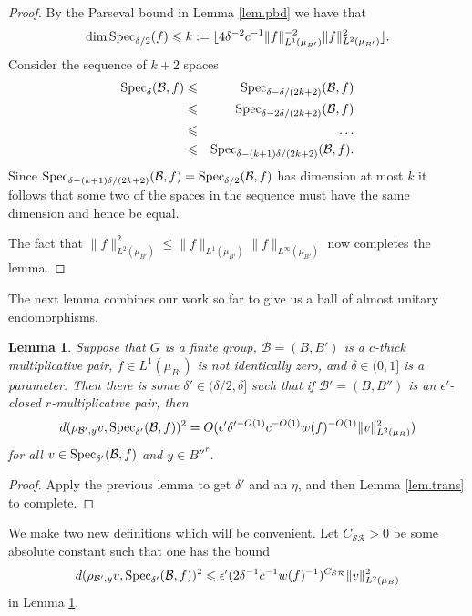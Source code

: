 \documentclass[12pt]{amsart}
\numberwithin{equation}{section}
\theoremstyle{plain}
\newtheorem{lemma}[subsection]{Lemma}
\theoremstyle{definition}
\renewcommand{\leq}{\leqslant}
\providecommand{\Spec}{\mathop{\rm Spec}\nolimits}
\begin{document}
\begin{proof}
By the Parseval bound in Lemma \ref{lem.pbd} we have that
\begin{equation*}
\dim \Spec_{\delta/2}(f) \leq k:=\lfloor 4\delta^{-2}c^{-1}\|f\|_{L^1(\mu_{B'})}^{-2}\|f\|_{L^2(\mu_{B'})}^2\rfloor.
\end{equation*}
Consider the sequence of $k+2$ spaces
\begin{eqnarray*}
\Spec_{\delta}(\mathcal{B},f) & \leq & \Spec_{\delta - \delta/(2k+2)}(\mathcal{B},f) \\ & \leq& \Spec_{\delta - 2\delta/(2k+2)}(\mathcal{B},f)\\&  \leq&  \dots \\ & \leq & \Spec_{\delta - (k+1)\delta/(2k+2)}(\mathcal{B},f).
\end{eqnarray*}
Since $ \Spec_{\delta-(k+1)\delta/(2k+2)}(\mathcal{B},f)=\Spec_{\delta/2}(\mathcal{B},f)$ has dimension at most $k$ it follows that some two of the spaces in the sequence must have the same dimension and hence be equal.

The fact that $\|f\|_{L^2(\mu_{B'})}^2 \leq \|f\|_{L^1(\mu_{B'})}\|f\|_{L^\infty(\mu_{B'})}$ now completes the lemma.
\end{proof}
The next lemma combines our work so far to give us a ball of almost unitary endomorphisms.
\begin{lemma}\label{lem.nr}
Suppose that $G$ is a finite group, $\mathcal{B}=(B,B')$ is a $c$-thick multiplicative pair, $f \in L^1(\mu_{B'})$ is not identically zero, and $\delta \in (0,1]$ is a parameter. Then there is some $\delta' \in (\delta/2,\delta]$ such that if  $\mathcal{B}'=(B,B'')$ is an $\epsilon'$-closed $r$-multiplicative pair, then
\begin{equation*}
d(\rho_{\mathcal{B}',y}v,\Spec_{\delta'}(\mathcal{B},f))^2 = O(\epsilon'\delta'^{-O(1)}c^{-O(1)}w(f)^{-O(1)}\|v\|_{L^2(\mu_B)}^2)
\end{equation*}
for all $v \in \Spec_{\delta'}(\mathcal{B},f)$ and $y \in B''^r$.
\end{lemma}
\begin{proof}
Apply the previous lemma to get $\delta'$ and an $\eta$, and then Lemma \ref{lem.trans} to complete.
\end{proof}
We make two new definitions which will be convenient.  Let $C_{\mathcal{S}\mathcal{R}}>0$ be some absolute constant such that one has the bound
\begin{equation*}
d(\rho_{\mathcal{B}',y}v,\Spec_{\delta'}(\mathcal{B},f))^2 \leq\epsilon'(2\delta^{-1}c^{-1}w(f)^{-1})^{C_{\mathcal{S}\mathcal{R}}}\|v\|_{L^2(\mu_B)}^2
\end{equation*}
in Lemma \ref{lem.nr}.
\end{document}
